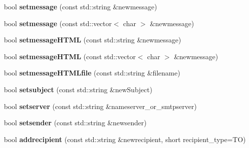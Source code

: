 \begin{DoxyCompactItemize}
\item 
\hypertarget{classjwsmtp_1_1mailer_ac1a1bb8ed20a7bb0e2e09ee495ae7c8c}{bool {\bfseries setmessage} (const std\-::string \&newmessage)}\label{classjwsmtp_1_1mailer_ac1a1bb8ed20a7bb0e2e09ee495ae7c8c}

\item 
\hypertarget{classjwsmtp_1_1mailer_afe8acd59ea809f7110bd391c09f5e163}{bool {\bfseries setmessage} (const std\-::vector$<$ char $>$ \&newmessage)}\label{classjwsmtp_1_1mailer_afe8acd59ea809f7110bd391c09f5e163}

\item 
\hypertarget{classjwsmtp_1_1mailer_a57d9e64123a363c105c741f4be61d050}{bool {\bfseries setmessage\-H\-T\-M\-L} (const std\-::string \&newmessage)}\label{classjwsmtp_1_1mailer_a57d9e64123a363c105c741f4be61d050}

\item 
\hypertarget{classjwsmtp_1_1mailer_a3a34f6893123bc4dd0b15cfb3c08d00e}{bool {\bfseries setmessage\-H\-T\-M\-L} (const std\-::vector$<$ char $>$ \&newmessage)}\label{classjwsmtp_1_1mailer_a3a34f6893123bc4dd0b15cfb3c08d00e}

\item 
\hypertarget{classjwsmtp_1_1mailer_a3c1c568d65e70362c090182bfa107777}{bool {\bfseries setmessage\-H\-T\-M\-Lfile} (const std\-::string \&filename)}\label{classjwsmtp_1_1mailer_a3c1c568d65e70362c090182bfa107777}

\item 
\hypertarget{classjwsmtp_1_1mailer_aab8f43694c42a82043dce23a5c49dfdd}{bool {\bfseries setsubject} (const std\-::string \&new\-Subject)}\label{classjwsmtp_1_1mailer_aab8f43694c42a82043dce23a5c49dfdd}

\item 
\hypertarget{classjwsmtp_1_1mailer_ae07dfb015a5a14f023f7b24eef81ba7e}{bool {\bfseries setserver} (const std\-::string \&nameserver\-\_\-or\-\_\-smtpserver)}\label{classjwsmtp_1_1mailer_ae07dfb015a5a14f023f7b24eef81ba7e}

\item 
\hypertarget{classjwsmtp_1_1mailer_ad57a8e1e89f333ee67cb97ed7dc79c16}{bool {\bfseries setsender} (const std\-::string \&newsender)}\label{classjwsmtp_1_1mailer_ad57a8e1e89f333ee67cb97ed7dc79c16}

\item 
\hypertarget{classjwsmtp_1_1mailer_addd31c1223de1b269973077f3f5ce60d}{bool {\bfseries addrecipient} (const std\-::string \&newrecipient, short recipient\-\_\-type=T\-O)}\label{classjwsmtp_1_1mailer_addd31c1223de1b269973077f3f5ce60d}


\end{DoxyCompactItemize}

